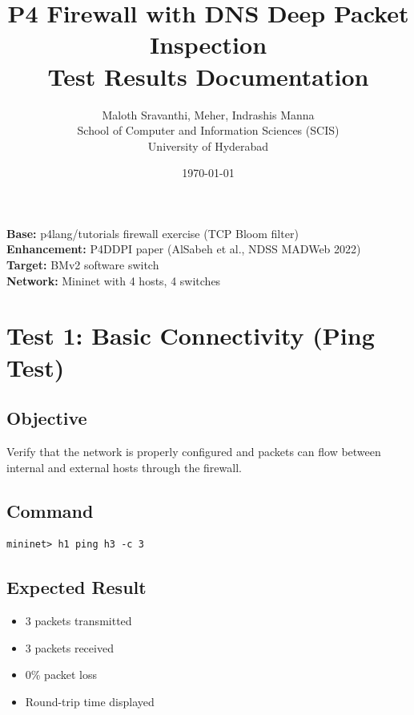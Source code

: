 \documentclass[11pt,a4paper]{article}
\title{\textbf{P4 Firewall with DNS Deep Packet Inspection}\\
\large Test Results Documentation}
\author{Maloth Sravanthi, Meher, Indrashis Manna\\
\small School of Computer and Information Sciences (SCIS)\\
\small University of Hyderabad}
\date{\today}
\begin{document}
\maketitle
\thispagestyle{empty}

\vspace{1em}

\begin{center}
\begin{tcolorbox}[colback=blue!5,colframe=blue!50,width=0.9\textwidth,title=Project Overview]
\textbf{Base:} p4lang/tutorials firewall exercise (TCP Bloom filter)\\
\textbf{Enhancement:} P4DDPI paper (AlSabeh et al., NDSS MADWeb 2022)\\
\textbf{Target:} BMv2 software switch\\
\textbf{Network:} Mininet with 4 hosts, 4 switches
\end{tcolorbox}
\end{center}

\newpage

\section*{Test 1: Basic Connectivity (Ping Test)}

\subsection*{Objective}
Verify that the network is properly configured and packets can flow between internal and external hosts through the firewall.

\subsection*{Command}
\begin{verbatim}
mininet> h1 ping h3 -c 3
\end{verbatim}

\subsection*{Expected Result}
\begin{itemize}
\item 3 packets transmitted
\item 3 packets received
\item 0\% packet loss
\item Round-trip time displayed
\end{itemize}
\end{document}
